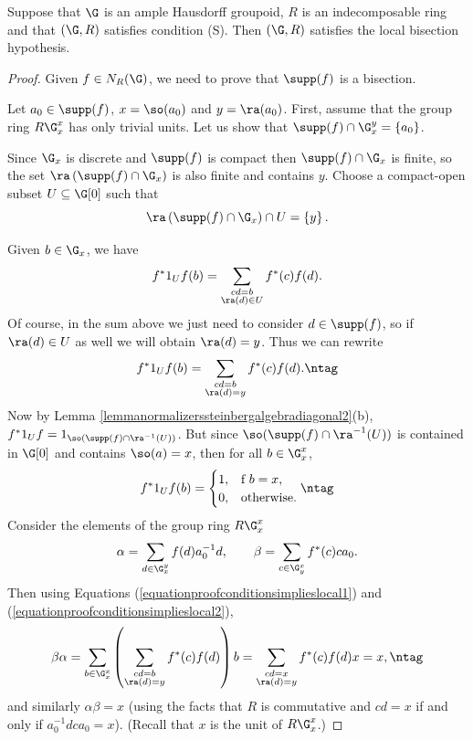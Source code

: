 \begin{proposition}\label{propositionconditionsimplieslocalbisectionhypothesis}
Suppose that $\G$ is an ample Hausdorff groupoid, $R$ is an indecomposable ring and that $(\G,R)$ satisfies condition (S). Then $(\G,R)$ satisfies the local bisection hypothesis.%
\end{proposition}
\begin{proof}
Given $f\in N_R(\G)$, we need to prove that $\supp(f)$ is a bisection.

Let $a_0\in\supp(f)$, $x=\so(a_0)$ and $y=\ra(a_0)$. First, assume that the group ring $R\G_x^x$ has only trivial units. Let us show that $\supp(f)\cap\G_x^y=\left\{a_0\right\}$.

Since $\G_x$ is discrete and $\supp(f)$ is compact then $\supp(f)\cap\G_x$ is finite, so the set $\ra\left(\supp(f)\cap\G_x\right)$ is also finite and contains $y$. Choose a compact-open subset $U\subseteq\G[0]$ such that
\[\ra\left(\supp(f)\cap\G_x\right)\cap U=\left\{y\right\}.\]

Given $b\in\G_x$, we have
\[f^*1_Uf(b)=\sum_{\substack{cd=b\\\ra(d)\in U}}f^*(c)f(d).\]
Of course, in the sum above we just need to consider $d\in\supp(f)$, so if $\ra(d)\in U$ as well we will obtain $\ra(d)=y$. Thus we can rewrite
\[f^*1_Uf(b)=\sum_{\substack{cd=b\\\ra(d)=y}}f^*(c)f(d).\ntag\label{equationproofconditionsimplieslocal1}\]
Now by Lemma \ref{lemmanormalizerssteinbergalgebradiagonal2}(b), $f^*1_Uf=1_{\so(\supp(f)\cap \ra^{-1}(U))}$. But since $\so(\supp(f)\cap \ra^{-1}(U))$ is contained in $\G[0]$ and contains $\so(a)=x$, then for all $b\in \G_x^x$,
\[f^*1_Uf(b)=\begin{cases}
1,&\text{f }b=x,\\
0,&\text{otherwise.}
\end{cases}\ntag\label{equationproofconditionsimplieslocal2}\]
Consider the elements of the group ring $R\G_x^x$
\[\alpha=\sum_{d\in\G_x^y}f(d)a_0^{-1}d,\qquad\beta=\sum_{c\in\G_y^x}f^*(c)ca_0.\]
Then using Equations (\ref{equationproofconditionsimplieslocal1}) and (\ref{equationproofconditionsimplieslocal2}),
\[\beta\alpha=\sum_{b\in\G_x^x}\left(\sum_{\substack{cd=b\\\ra(d)=y}}f^*(c)f(d)\right)b=\sum_{\substack{cd=x\\\ra(d)=y}}f^*(c)f(d)x=x,\ntag\label{equationproofconditionsimplieslocal}\]
and similarly $\alpha\beta=x$ (using the facts that $R$ is commutative and $cd=x$ if and only if $a_0^{-1}dca_0=x$). (Recall that $x$ is the unit of $R\G_x^x$.)


\end{proof}
